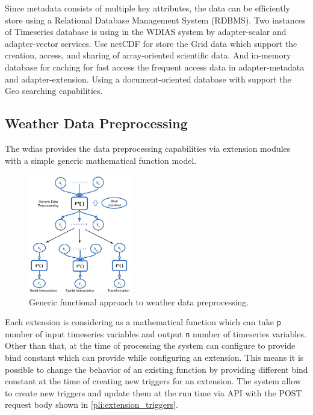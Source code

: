 \documentclass[conference]{IEEEtran}
\begin{document}
Since metadata consists of multiple key attributes, the data can be efficiently store using a Relational Database Management System (RDBMS). Two instances of Timeseries database is using in the WDIAS system by adapter-scalar and adapter-vector services. Use \acrfull{netCDF} for store the Grid data which support the creation, access, and sharing of array-oriented scientific data. And  in-memory database for caching for fast access the frequent access data in adapter-metadata and adapter-extension. Using a document-oriented database with support the Geo searching capabilities.

\subsection{Weather Data Preprocessing}
\label{psubse:data_preprocessing}

The \acrshort{wdias} provides the data preprocessing capabilities via extension modules with a simple generic mathematical function model.

\begin{figure}[htbp]
\centerline{\includegraphics[width=0.4\textwidth]{method/data_preprocess/summary_weather_data_preprocessing.jpg}}
\caption{Generic functional approach to weather data preprocessing.}
\label{pfi:summary_weather_data_preprocessing}
\end{figure}

Each extension is considering as a mathematical function which can take \texttt{p} number of input timeseries variables and output \texttt{n} number of timeseries variables. Other than that, at the time of processing the system can configure to provide bind constant which can provide while configuring an extension. This means it is possible to change the behavior of an existing function by providing different bind constant at the time of creating new triggers for an extension. The system allow to create new triggers and update them at the run time via API with the POST request body shown in \cref{pli:extension_triggers}.
\end{document}
